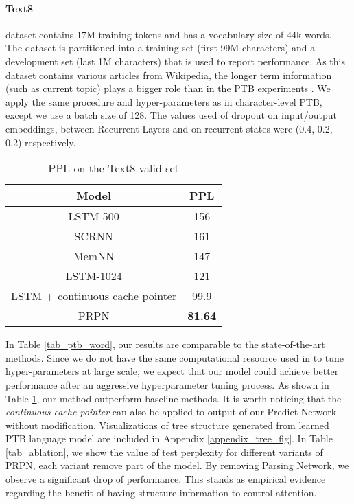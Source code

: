 \documentclass{article} \usepackage{iclr2018_conference,times}
\begin{document}
\paragraph{Text8} dataset contains 17M training tokens and has a vocabulary size of 44k words. The dataset is partitioned into a training set (first 99M characters) and a development set (last 1M characters) that is used to report performance. As this dataset contains various articles from Wikipedia, the longer term information (such as current topic) plays a bigger role than in the PTB experiments \citep{mikolov2014learning}. We apply the same procedure and hyper-parameters as in character-level PTB, except we use a batch size of 128. The values used of dropout on input/output embeddings, between Recurrent Layers and on recurrent states were (0.4, 0.2, 0.2) respectively.

\begin{table}[h]  
\centering  
  \begin{tabular}{ c c }
    \toprule[2pt]
    Model & PPL \\
    \hline
    LSTM-500 \citep{mikolov2014learning} &  156 \\
    SCRNN \citep{mikolov2014learning} & 161 \\
    MemNN \citep{sukhbaatar2015end} & 147 \\
    LSTM-1024 \citep{grave2016improving} & 121 \\
    LSTM + continuous cache pointer \citep{grave2016improving} & 99.9 \\
    \hline
    PRPN & \textbf{81.64} \\
    \toprule[2pt]
  \end{tabular}
  \caption{PPL on the Text8 valid set}
  \label{tab_text8_word}
\end{table}

In Table \ref{tab_ptb_word}, our results are comparable to the state-of-the-art methods. Since we do not have the same computational resource used in \citep{melis2017state} to tune hyper-parameters at large scale, we expect that our model could achieve better performance after an aggressive hyperparameter tuning process.
As shown in Table \ref{tab_text8_word}, our method outperform baseline methods. It is worth noticing that the \emph{continuous cache pointer} can also be applied to output of our Predict Network without modification. Visualizations of tree structure generated from learned PTB language model are included in Appendix \ref{appendix_tree_fig}.
In Table \ref{tab_ablation}, we show the value of test perplexity for different variants of PRPN, each variant remove part of the model. By removing Parsing Network, we observe a significant drop of performance. This stands as empirical evidence regarding the benefit of having structure information to control attention.
\end{document}

